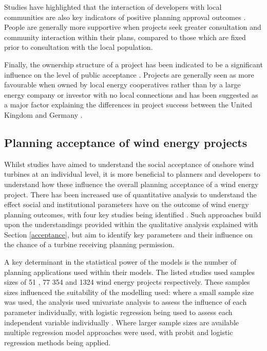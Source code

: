 \documentclass[a4paper,]{article}
\theoremstyle{definition}
\theoremstyle{definition}
\theoremstyle{definition}
\theoremstyle{remark}
\begin{document}
Studies have highlighted that the interaction of developers with local communities are also key indicators of positive planning approval outcomes \citep{Toke2005, Devine-Wright2005a, Wustenhagen2007}. People are generally more supportive when projects seek greater consultation and community interaction within their plans, compared to those which are fixed prior to consultation with the local population.

Finally, the ownership structure of a project has been indicated to be a significant influence on the level of public acceptance \citep{Sonnberger2017, Haggett2006}. Projects are generally seen as more favourable when owned by local energy cooperatives rather than by a large energy company or investor with no local connections and has been suggested as a major factor explaining the differences in project success between the United Kingdom and Germany \citep{Toke2008}.

\hypertarget{planning-acceptance-of-wind-energy-projects}{%
\subsection{Planning acceptance of wind energy projects}\label{planning-acceptance-of-wind-energy-projects}}

Whilst studies have aimed to understand the social acceptance of onshore wind turbines at an individual level, it is more beneficial to planners and developers to understand how these influence the overall planning acceptance of a wind energy project. There has been increased use of quantitative analysis to understand the effect social and institutional parameters have on the outcome of wind energy planning outcomes, with four key studies being identified \citep{Toke2005, VanderHorst2010, VanRensburg20, Roddis2018}. Such approaches build upon the understandings provided within the qualitative analysis explained with Section \ref{acceptance}, but aim to identify key parameters and their influence on the chance of a turbine receiving planning permission.

A key determinant in the statistical power of the models is the number of planning applications used within their models. The listed studies used samples sizes of 51 \citep{Toke2005}, 77 \citep{VanderHorst2010} 354 \citep{VanRensburg20} and 1324 \citep{Roddis2018} wind energy projects respectively. These samples sizes influenced the suitability of the modelling used: where a small sample size was used, the analysis used univariate analysis to assess the influence of each parameter individually, with logistic regression being used to assess each independent variable individually \citep{Toke2005, VanderHorst2010}. Where larger sample sizes are available multiple regression model approaches were used, with probit \citep{VanRensburg20} and logistic regression \citep{Roddis2018} methods being applied.
\end{document}

